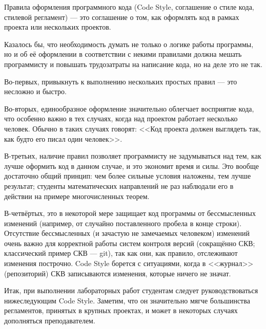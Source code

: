 Правила оформления программного кода (Code Style, соглашение о стиле кода, стилевой регламент) --- это соглашение о том, как оформлять код в рамках проекта или нескольких проектов.

Казалось бы, что необходимость думать не только о логике работы программы, но и об её оформлении в соответствии с некими правилами должна мешать программисту и повышать трудозатраты на написание кода, но на деле это не так.

Во-первых, привыкнуть к выполнению нескольких простых правил --- это несложно и быстро.

Во-вторых, единообразное оформление значительно облегчает восприятие кода, что особенно важно в тех случаях,
когда над проектом работает несколько человек.
Обычно в таких случаях говорят: <<Код проекта должен выглядеть так, как будто его писал один человек>>.

В-третьих, наличие правил позволяет программисту не задумываться над тем, как лучше оформить код в данном случае, и это экономит время и силы.
Это вообще достаточно общий принцип: чем более сильные условия наложены, тем лучше результат;
студенты математических направлений не раз наблюдали его в действии на примере многочисленных теорем.

В-четвёртых, это в некоторой мере защищает код программы от бессмысленных изменений (например, от случайно поставленного пробела в конце строки).
Отсутствие бессмысленных (и зачастую не замечаемых человеком) изменений очень важно для корректной работы систем контроля версий (сокращённо СКВ; классический пример СКВ --- git), так как они, как правило, отслеживают изменения построчно.
Code Style борется с ситуациями, когда в <<журнал>> (репозиторий) СКВ записываются изменения, которые ничего не значат.

Итак, при выполнении лабораторных работ студентам следует руководствоваться нижеследующим Code Style.
Заметим, что он значительно мягче большинства регламентов, принятых в крупных проектах,
и может в некоторых случаях дополняться преподавателем.


